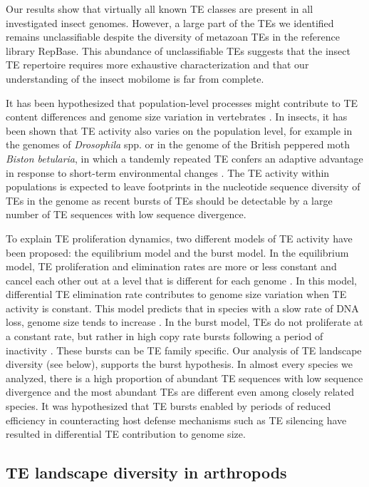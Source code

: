 Our results show that virtually all known TE classes are present in all investigated insect genomes.
However, a large part of the TEs we identified remains unclassifiable despite the diversity of metazoan TEs in the reference library RepBase.
This abundance of unclassifiable TEs suggests that the insect TE repertoire requires more exhaustive characterization and that our understanding of the insect mobilome is far from complete.

It has been hypothesized that population-level processes might
contribute to TE content differences and genome size variation in
vertebrates \citep{Lynch2003a}. In insects, it has been shown that TE
activity also varies on the population level, for example in the genomes
of \emph{Drosophila} spp. \citep{Perrat2013,Li2013,Blumenstiel2014} or
in the genome of the British peppered moth \emph{Biston betularia}, in
which a tandemly repeated TE confers an adaptive advantage in response
to short-term environmental changes \citep{Hof2016}. The TE activity
within populations is expected to leave footprints in the nucleotide
sequence diversity of TEs in the genome as recent bursts of TEs should
be detectable by a large number of TE sequences with low sequence
divergence.

To explain TE proliferation dynamics, two different models of TE
activity have been proposed: the equilibrium model and the burst model.
In the equilibrium model, TE proliferation and elimination rates are
more or less constant and cancel each other out at a level that is
different for each genome \citep{Charlesworth1983}. In this model,
differential TE elimination rate contributes to genome size variation
when TE activity is constant. This model predicts that in species with a
slow rate of DNA loss, genome size tends to increase \citep{Petrov2011,Sun2011}.
In the burst model, TEs do not proliferate at a constant rate, but
rather in high copy rate bursts following a period of inactivity
\citep{Blumenstiel2014}. These bursts can be TE family specific. Our analysis
of TE landscape diversity (see below), supports the burst hypothesis. In
almost every species we analyzed, there is a high proportion of abundant
TE sequences with low sequence divergence and the most abundant TEs are
different even among closely related species. It was hypothesized that
TE bursts enabled by periods of reduced efficiency in counteracting host
defense mechanisms such as TE silencing \citep{LeRouzic2006,Rebollo2010} have resulted
in differential TE contribution to genome size.

\subsection{TE landscape diversity in
arthropods}\label{te-landscape-diversity-in-arthropods}

